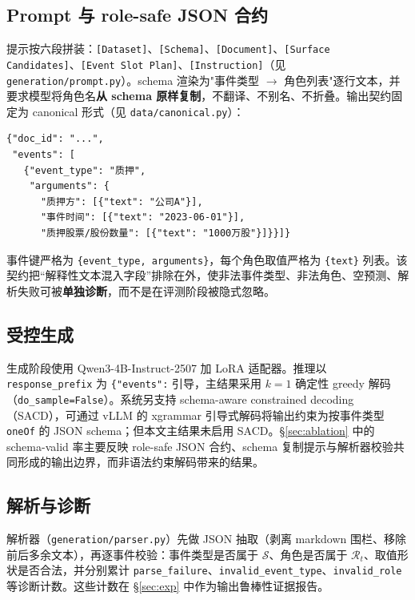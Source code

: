 \documentclass[UTF8,fontset=none,11pt]{ctexart}
\begin{document}
\subsection{Prompt 与 role-safe JSON 合约}

提示按六段拼装：\texttt{[Dataset]}、\texttt{[Schema]}、\texttt{[Document]}、\texttt{[Surface Candidates]}、\texttt{[Event Slot Plan]}、\texttt{[Instruction]}（见 \texttt{generation/prompt.py}）。schema 渲染为"事件类型 $\rightarrow$ 角色列表"逐行文本，并要求模型将角色名\textbf{从 schema 原样复制}，不翻译、不别名、不折叠。输出契约固定为 canonical 形式（见 \texttt{data/canonical.py}）：

\begin{verbatim}
{"doc_id": "...",
 "events": [
   {"event_type": "质押",
    "arguments": {
      "质押方": [{"text": "公司A"}],
      "事件时间": [{"text": "2023-06-01"}],
      "质押股票/股份数量": [{"text": "1000万股"}]}}]}
\end{verbatim}

事件键严格为 \texttt{\{event\_type, arguments\}}，每个角色取值严格为 \texttt{\{text\}} 列表。该契约把“解释性文本混入字段”排除在外，使非法事件类型、非法角色、空预测、解析失败可被\textbf{单独诊断}，而不是在评测阶段被隐式忽略。

\subsection{受控生成}

生成阶段使用 Qwen3-4B-Instruct-2507 加 LoRA 适配器。推理以 \texttt{response\_prefix} 为 \verb|{"events":| 引导，主结果采用 $k=1$ 确定性 greedy 解码（\texttt{do\_sample=False}）。系统另支持 schema-aware constrained decoding（SACD），可通过 vLLM 的 xgrammar 引导式解码将输出约束为按事件类型 \texttt{oneOf} 的 JSON schema；但本文主结果未启用 SACD。§\ref{sec:ablation} 中的 schema-valid 率主要反映 role-safe JSON 合约、schema 复制提示与解析器校验共同形成的输出边界，而非语法约束解码带来的结果。

\subsection{解析与诊断}

解析器（\texttt{generation/parser.py}）先做 JSON 抽取（剥离 markdown 围栏、移除前后多余文本），再逐事件校验：事件类型是否属于 $\mathcal{S}$、角色是否属于 $\mathcal{R}_t$、取值形状是否合法，并分别累计 \texttt{parse\_failure}、\texttt{invalid\_event\_type}、\texttt{invalid\_role} 等诊断计数。这些计数在 §\ref{sec:exp} 中作为输出鲁棒性证据报告。
\end{document}
